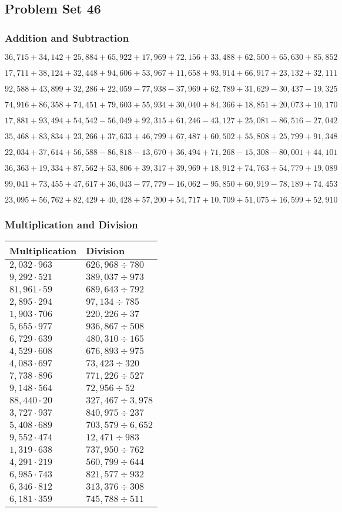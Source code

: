 \hypertarget{problem-set-46-3}{%
\subsection{Problem Set 46}\label{problem-set-46-3}}

\hypertarget{addition-and-subtraction-268}{%
\subsubsection{Addition and
Subtraction}\label{addition-and-subtraction-268}}

\(36,715+34,142+25,884+65,922+17,969+72,156+33,488+62,500+65,630+ 85,852\)

\(17,711+38,124+32,448+94,606+53,967+11,658+93,914+66,917+23,132+32,111\)

\(92,588+43,899+32,286+22,059-77,938-37,969+62,789+31,629-30,437-19,325\)

\(74,916+86,358+74,451+79,603+55,934+30,040+84,366+18,851+20,073+10,170\)

\(17,881+93,494+54,542-56,049+92,315+61,246-43,127+25,081-86,516-27,042\)

\(35,468+83,834+23,266+37,633+46,799+67,487+60,502+55,808+25,799+91,348\)

\(22,034+37,614+56,588-86,818-13,670+36,494+71,268-15,308-80,001+44,101\)

\(36,363+19,334+87,562+53,806+39,317+39,969+18,912+74,763+54,779+19,089\)

\(99,041+73,455+47,617+36,043-77,779-16,062-95,850+60,919-78,189+74,453\)

\(23,095+56,762+82,429+40,428+57,200+54,717+10,709+51,075+16,599+52,910\)

\hypertarget{multiplication-and-division-267}{%
\subsubsection{Multiplication and
Division}\label{multiplication-and-division-267}}

\begin{longtable}[]{@{}ll@{}}
\toprule
Multiplication & Division\tabularnewline
\midrule
\endhead
\(2,032\cdot963\) & \(626,968÷780\)\tabularnewline
\(9,292\cdot521\) & \(389,037÷973\)\tabularnewline
\(81,961\cdot59\) & \(689,643÷792\)\tabularnewline
\(2,895\cdot294\) & \(97,134÷785\)\tabularnewline
\(1,903\cdot706\) & \(220,226÷37\)\tabularnewline
\(5,655\cdot977\) & \(936,867÷508\)\tabularnewline
\(6,729\cdot639\) & \(480,310÷165\)\tabularnewline
\(4,529\cdot608\) & \(676,893÷975\)\tabularnewline
\(4,083\cdot697\) & \(73,423÷320\)\tabularnewline
\(7,738\cdot896\) & \(771,226÷527\)\tabularnewline
\(9,148\cdot564\) & \(72,956÷52\)\tabularnewline
\(88,440\cdot20\) & \(327,467÷3,978\)\tabularnewline
\(3,727\cdot937\) & \(840,975÷237\)\tabularnewline
\(5,408\cdot689\) & \(703,579÷6,652\)\tabularnewline
\(9,552\cdot474\) & \(12,471÷983\)\tabularnewline
\(1,319\cdot638\) & \(737,950÷762\)\tabularnewline
\(4,291\cdot219\) & \(560,799÷644\)\tabularnewline
\(6,985\cdot743\) & \(821,577÷932\)\tabularnewline
\(6,346\cdot812\) & \(313,376÷308\)\tabularnewline
\(6,181\cdot359\) & \(745,788÷511\)\tabularnewline
\bottomrule
\end{longtable}

